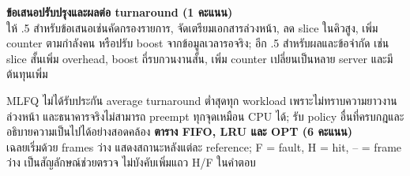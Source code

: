 \noindent\textbf{ข้อเสนอปรับปรุงและผลต่อ turnaround (1 คะแนน)}\\
ให้ .5 สำหรับข้อเสนอเช่นคัดกรองรายการ, จัดเตรียมเอกสารล่วงหน้า, ลด slice ในคิวสูง, เพิ่ม counter ตามกำลังคน หรือปรับ boost จากข้อมูลเวลารอจริง; อีก .5 สำหรับผลและข้อจำกัด เช่น slice สั้นเพิ่ม overhead, boost ถี่รบกวนงานสั้น, เพิ่ม counter เปลี่ยนเป็นหลาย server และมีต้นทุนเพิ่ม
\par\medskip
\noindent MLFQ ไม่ได้รับประกัน average turnaround ต่ำสุดทุก workload เพราะไม่ทราบความยาวงานล่วงหน้า และธนาคารจริงไม่สามารถ preempt ทุกจุดเหมือน CPU ได้; รับ policy อื่นที่ครบกฎและอธิบายความเป็นไปได้อย่างสอดคล้อง
\newpage{}
\noindent\textbf{ตาราง FIFO, LRU และ OPT (6 คะแนน)}\\
เฉลยเริ่มด้วย frames ว่าง แสดงสถานะหลังแต่ละ reference; F = fault, H = hit, -- = frame ว่าง เป็นสัญลักษณ์ช่วยตรวจ ไม่บังคับเพิ่มแถว H/F ในคำตอบ\par\smallskip

